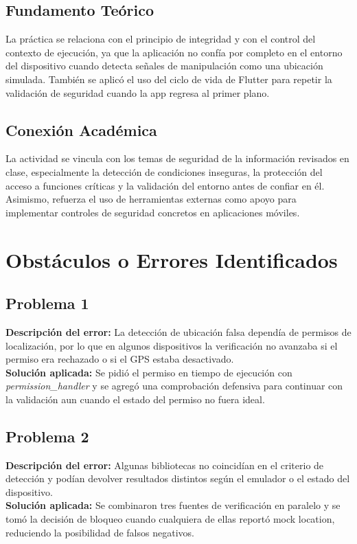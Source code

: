 \documentclass[12pt, a4paper]{article}
\begin{document}
\subsection*{Fundamento Teórico}
La práctica se relaciona con el principio de integridad y con el control del contexto de ejecución, ya que la aplicación no confía por completo en el entorno del dispositivo cuando detecta señales de manipulación como una ubicación simulada. También se aplicó el uso del ciclo de vida de Flutter para repetir la validación de seguridad cuando la app regresa al primer plano.

\subsection*{Conexión Académica}
La actividad se vincula con los temas de seguridad de la información revisados en clase, especialmente la detección de condiciones inseguras, la protección del acceso a funciones críticas y la validación del entorno antes de confiar en él. Asimismo, refuerza el uso de herramientas externas como apoyo para implementar controles de seguridad concretos en aplicaciones móviles.

\section{Obstáculos o Errores Identificados}

\subsection*{Problema 1}
\textbf{Descripción del error:} La detección de ubicación falsa dependía de permisos de localización, por lo que en algunos dispositivos la verificación no avanzaba si el permiso era rechazado o si el GPS estaba desactivado.\\[4pt]
\textbf{Solución aplicada:} Se pidió el permiso en tiempo de ejecución con \textit{permission\_handler} y se agregó una comprobación defensiva para continuar con la validación aun cuando el estado del permiso no fuera ideal.

\subsection*{Problema 2}
\textbf{Descripción del error:} Algunas bibliotecas no coincidían en el criterio de detección y podían devolver resultados distintos según el emulador o el estado del dispositivo.\\[4pt]
\textbf{Solución aplicada:} Se combinaron tres fuentes de verificación en paralelo y se tomó la decisión de bloqueo cuando cualquiera de ellas reportó mock location, reduciendo la posibilidad de falsos negativos.
\end{document}
